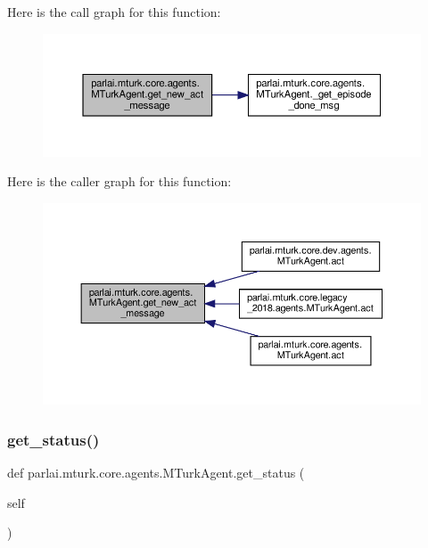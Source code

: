 Here is the call graph for this function\+:
\nopagebreak
\begin{figure}[H]
\begin{center}
\leavevmode
\includegraphics[width=350pt]{classparlai_1_1mturk_1_1core_1_1agents_1_1MTurkAgent_a04758a4244229d4978a92573ec538883_cgraph}
\end{center}
\end{figure}
Here is the caller graph for this function\+:
\nopagebreak
\begin{figure}[H]
\begin{center}
\leavevmode
\includegraphics[width=350pt]{classparlai_1_1mturk_1_1core_1_1agents_1_1MTurkAgent_a04758a4244229d4978a92573ec538883_icgraph}
\end{center}
\end{figure}
\mbox{\label{classparlai_1_1mturk_1_1core_1_1agents_1_1MTurkAgent_a0522b17872a4a9a22e2c0e5237f8ac82}} 
\subsubsection{\texorpdfstring{get\+\_\+status()}{get\_status()}}
{\footnotesize\ttfamily def parlai.\+mturk.\+core.\+agents.\+M\+Turk\+Agent.\+get\+\_\+status (\begin{DoxyParamCaption}\item[{}]{self }\end{DoxyParamCaption})}


